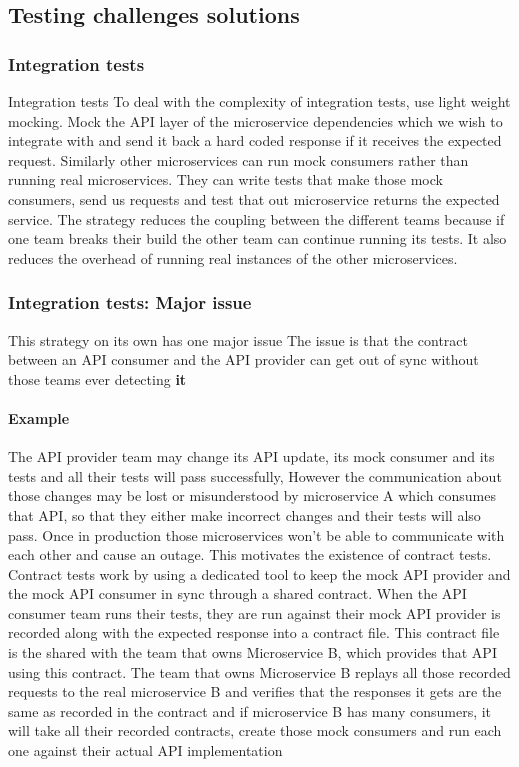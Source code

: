 \subsection{Testing challenges solutions}

\subsubsection{Integration tests}
Integration tests
To deal with the complexity of integration tests, use light weight mocking.
Mock the API layer of the microservice dependencies which we wish to integrate with and send it back a hard coded response if it receives the expected request.
Similarly other microservices can run mock consumers rather than running real microservices.
They can write tests that make those mock consumers, send us requests and test that out microservice returns the expected service.
The strategy reduces the coupling between the different teams because if one team breaks their build the other team can continue running its tests.
It also reduces the overhead of running real instances of the other microservices.

\subsubsection{Integration tests: Major issue}
This strategy on its own has one major issue
The issue is that the contract between an API consumer and the API provider can get out of sync without those teams ever detecting \textbf{it}

\paragraph{Example}
The API provider team may change its API update, its mock consumer and its tests and all their tests will pass successfully,
However the communication about those changes may be lost or misunderstood by microservice A which consumes that API, so that they either make incorrect changes and their tests will also pass.
Once in production those microservices won't be able to communicate with each other and cause an outage.
This motivates the existence of contract tests.
Contract tests work by using a dedicated tool to keep the mock API provider and the mock API consumer in sync through a shared contract.
When the API consumer team runs their tests, they are run against their mock API provider is recorded along with the expected response into a contract file.
This contract file is the shared with the team that owns Microservice B, which provides that API using this contract.
The team that owns Microservice B replays all those recorded requests to the real microservice B and verifies that the responses it gets are the same as recorded in the contract and if microservice B has many consumers, it will take all their recorded contracts, create those mock consumers and run each one against their actual API implementation

